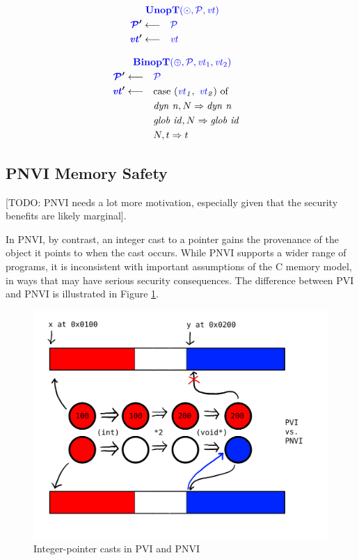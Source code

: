 \documentclass[acmsmall,review,anonymous]{acmart}\settopmatter{printfolios=true,printccs=false,printacmref=false}
\begin{document}
\begin{minipage}[t]{.49\textwidth}            
  \[\begin{aligned}
  \truledef{\unopt}
  \settag{\PCT'}{\PCT}
  \settag{\vt'}{\vt}
  \end{aligned}\]
\end{minipage}
\begin{minipage}[t]{.49\textwidth}           
  \[\begin{aligned}
  \truledef{\binopt}
  \settag{\PCT'}{\PCT}
  \settag{\vt'}{\caseof{(\vt_1,~ \vt_2)}}
  \caseentry{\mathit{dyn ~ n},N}{\mathit{dyn ~ n}} \\
  \caseentry{\mathit{glob ~ id},N}{\mathit{glob ~ id}} \\
  \caseentry{N,t}{t} \\
  \end{aligned}\]
\end{minipage}

\subsection{PNVI Memory Safety}
\label{sec:PNVI}

[TODO: PNVI needs a lot more motivation, especially given that the security benefits are
  likely marginal].

In PNVI, by contrast, an integer cast to a pointer gains the provenance of the object it points
to when the cast occurs. While PNVI supports a wider range of programs, it is inconsistent with important
assumptions of the C memory model, in ways that may have serious security consequences.
The difference between PVI and PNVI is illustrated in Figure \ref{fig:PVI-PNVI}.

\begin{figure}
  \includegraphics[width=.6\textwidth]{PVIvsPNVI.png}
  \caption{Integer-pointer casts in PVI and PNVI}
  \label{fig:PVI-PNVI}
\end{figure}
\end{document}
